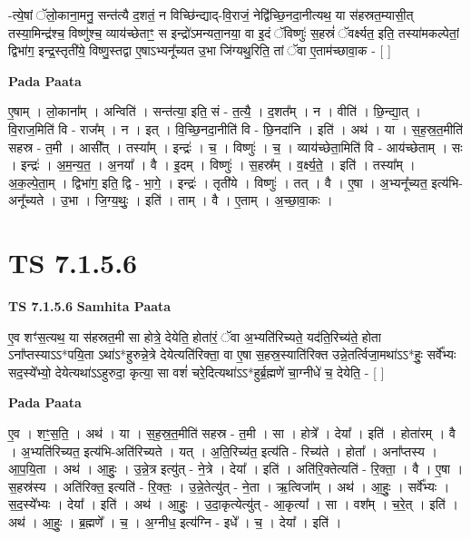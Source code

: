 \documentclass[17pt]{extarticle}
\begin{document}
-त्ये॒षां ॅलो॒काना॒मनु॒ सन्त॑त्यै द॒शतं॒ न विच्छि॑न्द्याद्-वि॒राजं॒ नेद्वि॑च्छि॒नदा॒नीत्यथ॒ या स॑हस्रत॒म्यासी॒त् तस्या॒मिन्द्र॑श्च॒ विष्णु॑श्च॒ व्याय॑च्छेताꣳ॒॒ स इन्द्रो॑ऽमन्यता॒नया॒ वा इ॒दं ॅविष्णुः॑ स॒हस्रं॑ ॅवर्क्ष्यत॒ इति॒ तस्या॑मकल्पेतां॒ द्विभा॑ग॒ इन्द्र॒स्तृती॑ये॒ विष्णु॒स्तद्वा ए॒षाऽभ्यनू᳚च्यत उ॒भा जि॑ग्यथु॒रिति॒ तां ॅवा ए॒ताम॑च्छावा॒क - [  ] \newline

\textbf{Pada Paata} \newline

ए॒षाम् । लो॒काना᳚म् । अन्विति॑ । सन्त॑त्या॒ इति॒ सं - त॒त्यै॒ । द॒शत᳚म् । न । वीति॑ । छि॒न्द्या॒त् । वि॒राज॒मिति॑ वि - राज᳚म् । न । इत् । वि॒च्छि॒नदा॒नीति॑ वि - छि॒नदा॑नि । इति॑ । अथ॑ । या । स॒ह॒स्र॒त॒मीति॑ सहस्र - त॒मी । आसी᳚त् । तस्या᳚म् । इन्द्रः॑ । च॒ । विष्णुः॑ । च॒ । व्याय॑च्छेता॒मिति॑ वि - आय॑च्छेताम् । सः । इन्द्रः॑ । अ॒म॒न्य॒त॒ । अ॒नया᳚ । वै । इ॒दम् । विष्णुः॑ । स॒हस्र᳚म् । व॒र्क्ष्य॒ते॒ । इति॑ । तस्या᳚म् । अ॒क॒ल्पे॒ता॒म् । द्विभा॑ग॒ इति॒ द्वि - भा॒गे॒ । इन्द्रः॑ । तृती॑ये । विष्णुः॑ । तत् । वै । ए॒षा । अ॒भ्यनू᳚च्यत॒ इत्य॑भि-अनू᳚च्यते । उ॒भा । जि॒ग्य॒थुः॒ । इति॑ । ताम् । वै । ए॒ताम् । अ॒च्छा॒वा॒कः ।  \newline




\section*{ TS 7.1.5.6 }

\textbf{TS 7.1.5.6 } \newline
\textbf{Samhita Paata} \newline

ए॒व शꣳ॑स॒त्यथ॒ या स॑हस्रत॒मी सा होत्रे॒ देयेति॒ होता॑रं॒ ॅवा अ॒भ्यति॑रिच्यते॒ यद॑ति॒रिच्य॑ते॒ होता ऽना᳚प्तस्याऽऽ*पयि॒ता ऽथा॑ऽ*हुरुन्ने॒त्रे देयेत्यति॑रिक्ता॒ वा ए॒षा स॒हस्र॒स्याति॑रिक्त उन्ने॒तर्त्विजा॒मथा॑ऽऽ*हुः॒ सर्वे᳚भ्यः सद॒स्ये᳚भ्यो॒ देयेत्यथा॑ऽऽहुरुदा॒ कृत्या॒ सा वशं॑ चरे॒दित्यथा॑ऽऽ*हुर्ब्र॒ह्मणे॑ चा॒ग्नीधे॑ च॒ देयेति॒ - [  ] \newline

\textbf{Pada Paata} \newline

ए॒व । शꣳ॒॒स॒ति॒ । अथ॑ । या । स॒ह॒स्र॒त॒मीति॑ सहस्र - त॒मी । सा । होत्रे᳚ । देया᳚ । इति॑ । होता॑रम् । वै । अ॒भ्यति॑रिच्यत॒ इत्य॑भि-अति॑रिच्यते । यत् । अ॒ति॒रिच्य॑त॒ इत्य॑ति - रिच्य॑ते । होता᳚ । अना᳚प्तस्य । आ॒प॒यि॒ता । अथ॑ । आ॒हुः॒ । उ॒न्ने॒त्र इत्यु॑त् - ने॒त्रे । देया᳚ । इति॑ । अति॑रि॒क्तेत्यति॑ - रि॒क्ता॒ । वै । ए॒षा । स॒हस्र॑स्य । अति॑रिक्त॒ इत्यति॑ - रि॒क्तः॒ । उ॒न्ने॒तेत्यु॑त् - ने॒ता । ऋ॒त्विजा᳚म् । अथ॑ । आ॒हुः॒ । सर्वे᳚भ्यः । स॒द॒स्ये᳚भ्यः । देया᳚ । इति॑ । अथ॑ । आ॒हुः॒ । उ॒दा॒कृत्येत्यु॑त् - आ॒कृत्या᳚ । सा । वश᳚म् । च॒रे॒त् । इति॑ । अथ॑ । आ॒हुः॒ । ब्र॒ह्मणे᳚ । च॒ । अ॒ग्नीध॒ इत्य॑ग्नि - इधे᳚ । च॒ । देया᳚ । इति॑ ।  \newline
\end{document}
